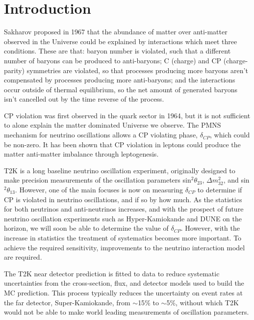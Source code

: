 \chapter{Introduction} \label{sec:introductions}

Sakharov\cite{sakharov} proposed in 1967 that the abundance of matter over anti-matter observed in the Universe could be explained by interactions which meet three conditions. These are that: baryon number is violated, such that a different number of baryons can be produced to anti-baryons; C (charge) and CP (charge-parity) symmetries are violated, so that processes producing more baryons aren't compensated by processes producing more anti-baryons; and the interactions occur outside of thermal equilibrium, so the net amount of generated baryons isn't cancelled out by the time reverse of the process. 

CP violation was first observed in the quark sector in 1964\cite{quarkcpv}, but it is not sufficient to alone explain the matter dominated Universe we observe. The PMNS mechanism for neutrino oscillations allows a CP violating phase, $\delta_{CP}$, which could be non-zero. It has been shown that CP violation in leptons could produce the matter anti-matter imbalance through leptogenesis\cite{leptogenesis}. 

T2K \cite{PhysRevLett.121.171802} is a long baseline neutrino oscillation experiment, originally designed to make precision measurements of the oscillation parameters sin$^2\theta_{23}$, $\Delta m^2_{32}$, and sin$^2\theta_{13}$. However, one of the main focuses is now on measuring $\delta_{CP}$ to determine if CP is violated in neutrino oscillations, and if so by how much. As the statistics for both neutrinos and anti-neutrinos increases, and with the prospect of future neutrino oscillation experiments such as Hyper-Kamiokande \cite{Abe:2018uyc} and DUNE \cite{acciarri2016longbaseline} on the horizon, we will soon be able to determine the value of  $\delta_{CP}$. However, with the increase in statistics the treatment of systematics becomes more important. To achieve the required sensitivity, improvements to the neutrino interaction model are required.

The T2K near detector prediction is fitted to data to reduce systematic uncertainties from the cross-section, flux, and detector models used to build the MC prediction. This process typically reduces the uncertainty on event rates at the far detector, Super-Kamiokande, from $\sim$15$\%$ to $\sim$5$\%$, without which T2K would not be able to make world leading measurements of oscillation parameters.

